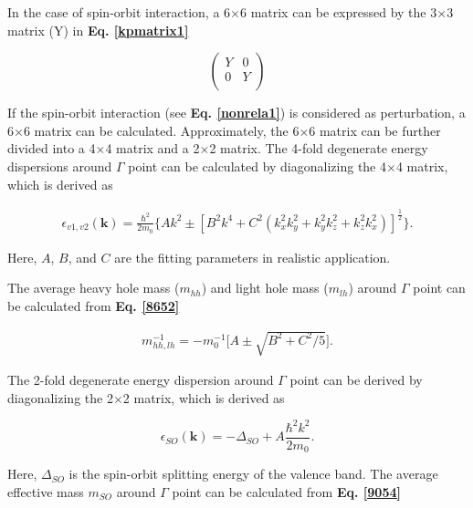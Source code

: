 \documentclass[a4paper, 12pt, titlepage,oneside,drop]{kthesis}
\begin{document}
In the case of spin-orbit interaction, a 6$\times$6 matrix can be expressed by the 3$\times$3 matrix (Y) in \textbf{Eq. \ref{kpmatrix1}}

\begin{equation}\label{kpmatrix2}
\left(
\begin{matrix}
    Y  & 0 \\
    0  & Y \\
\end{matrix} \right)
\end{equation}

If the spin-orbit interaction (see \textbf{Eq. \ref{nonrela1}}) is considered as perturbation, a 6$\times$6 matrix can be calculated. Approximately, the 6$\times$6 matrix can be further divided into a 4$\times$4 matrix and a 2$\times$2 matrix.
The 4-fold degenerate energy dispersions around $\Gamma$ point can be calculated by diagonalizing the 4$\times$4 matrix, which is derived as

\begin{equation} \begin{split}\label{8652}
\epsilon_{v1, v2} (\textbf{k}) = \frac{\hbar^2}{2m_0}\Big\{Ak^2\pm[B^2k^4 + C^2 (k_x^{2}k_y^{2} + k_y^{2}k_z^{2} +k_z^{2}k_x^{2} )]^{\frac{1}{2}}\Big\}.
 \end{split}
\end{equation}

Here, $A$, $B$, and $C$ are the fitting parameters in realistic application.

The average heavy hole mass ($m_{hh}$) and light hole mass ($m_{lh}$) around $\Gamma$ point can be calculated from  \textbf{Eq. \ref{8652}} 

\begin{equation}\begin{split}
m_{hh,lh}^{-1} = -{m_0^{-1}} \Big[A \pm \sqrt{B^2+C^2/5} \Big].
 \end{split}
\end{equation}


The 2-fold degenerate energy dispersion around $\Gamma$ point can be derived by diagonalizing the 2$\times$2 matrix, which is derived as

\begin{equation}\label{9054}
 \epsilon_{SO} (\textbf{k}) = -\varDelta_{SO} + A \frac{\hbar^2 {k}^2}{2m_0}.
\end{equation}

Here, $\varDelta_{SO}$ is the spin-orbit splitting energy of the valence band. The average effective mass $m_{SO}$ around $\Gamma$ point can be calculated from  \textbf{Eq. \ref{9054}} 
\end{document}

